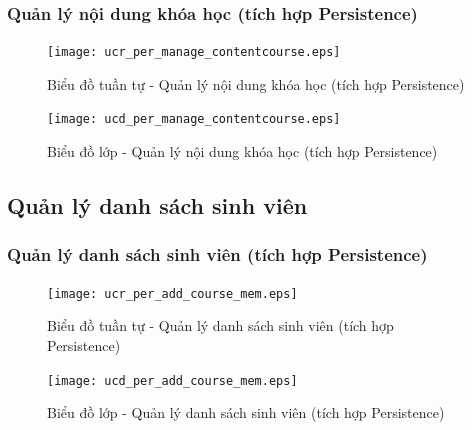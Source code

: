 \documentclass[./../main.tex]{subfiles}
\begin{document}
\subsubsection{Quản lý nội dung khóa học (tích hợp Persistence)}
\begin{figure}[H]
    \centering
    \texttt{[image: ucr\_per\_manage\_contentcourse.eps]}
    \caption{Biểu đồ tuần tự - Quản lý nội dung khóa học (tích hợp Persistence)}
\end{figure}
\begin{figure}[H]
    \centering
    \texttt{[image: ucd\_per\_manage\_contentcourse.eps]}
    \caption{Biểu đồ lớp - Quản lý nội dung khóa học (tích hợp Persistence)}
\end{figure}

\subsection{Quản lý danh sách sinh viên}
\subsubsection{Quản lý danh sách sinh viên (tích hợp Persistence)}
\begin{figure}[H]
    \centering
    \texttt{[image: ucr\_per\_add\_course\_mem.eps]}
    \caption{Biểu đồ tuần tự - Quản lý danh sách sinh viên (tích hợp Persistence)}
\end{figure}
\begin{figure}[H]
    \centering
    \texttt{[image: ucd\_per\_add\_course\_mem.eps]}
    \caption{Biểu đồ lớp - Quản lý danh sách sinh viên (tích hợp Persistence)}
\end{figure}
\end{document}

